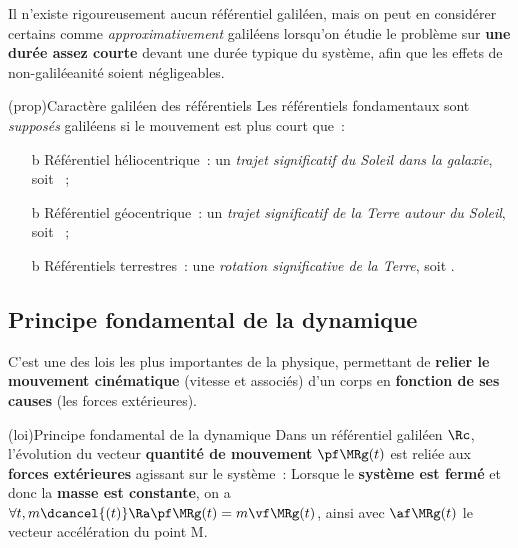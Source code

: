 \documentclass[../../main/main.tex]{subfiles}
\begin{document}
Il n'existe rigoureusement aucun référentiel galiléen, mais on peut en
considérer certains comme \textit{approximativement} galiléens lorsqu'on étudie
le problème sur \textbf{une durée assez courte} devant une durée typique du
système, afin que les effets de non-galiléeanité soient négligeables.

\begin{tcb*}[breakable](prop){Caractère galiléen des référentiels}
	Les référentiels fondamentaux sont \textit{supposés} galiléens si le mouvement
	est plus court que~:
	\begin{itemize}
		\item[b]{Référentiel héliocentrique}~:
		      un \textit{trajet significatif du Soleil dans la galaxie}, soit
		      ~;
		\item[b]{Référentiel géocentrique}~:
		      un \textit{trajet significatif de la Terre autour du Soleil}, soit
		      ~;
		\item[b]{Référentiels terrestres}~:
		      une \textit{rotation significative de la Terre}, soit
		      .
	\end{itemize}
\end{tcb*}

\subsection{Principe fondamental de la dynamique}

C'est une des lois les plus importantes de la physique, permettant de
\textbf{relier le mouvement cinématique} (vitesse et associés) d'un corps en
\textbf{fonction de ses causes} (les forces extérieures).

\begin{tcb*}[list entry={\lte\theloi~:~Ppe. fondamental de la dynamique}]
	(loi){Principe fondamental de la dynamique}
	Dans un référentiel galiléen $\Rc$, l'évolution du vecteur
	\textbf{quantité de mouvement} $\pf\MRg(t)$ est reliée aux \textbf{forces
		extérieures} agissant sur le système~:
	\psw{%
		\[
			\boxed{\dv{\pf\MRg}{t} = \sum \Ff_{\ext\ra\Mr}}
		\]
	}
	Lorsque le \textbf{système est fermé} et donc la \textbf{masse est constante},
	on a $\forall t, m \dcancel{(t)} \Ra \pf\MRg(t) = m\vf\MRg(t)$, ainsi
	\psw{%
		\[
			\boxed{m\af\MRg(t) = \sum \Ff_{\ext\ra\Mr}}
		\]
	}
	avec $\af\MRg(t)$ le vecteur accélération du point M.
\end{tcb*}
\end{document}
